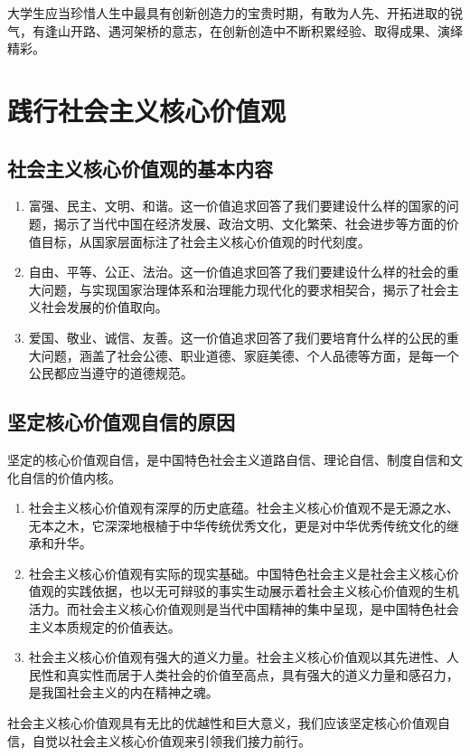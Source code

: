 大学生应当珍惜人生中最具有创新创造力的宝贵时期，有敢为人先、开拓进取的锐气，有逢山开路、遇河架桥的意志，在创新创造中不断积累经验、取得成果、演绎精彩。

\section{践行社会主义核心价值观}
\subsection{社会主义核心价值观的基本内容}
\begin{enumerate}
\item 富强、民主、文明、和谐。这一价值追求回答了我们要建设什么样的国家的问题，揭示了当代中国在经济发展、政治文明、文化繁荣、社会进步等方面的价值目标，从国家层面标注了社会主义核心价值观的时代刻度。
\item 自由、平等、公正、法治。这一价值追求回答了我们要建设什么样的社会的重大问题，与实现国家治理体系和治理能力现代化的要求相契合，揭示了社会主义社会发展的价值取向。
\item 爱国、敬业、诚信、友善。这一价值追求回答了我们要培育什么样的公民的重大问题，涵盖了社会公德、职业道德、家庭美德、个人品德等方面，是每一个公民都应当遵守的道德规范。
\end{enumerate}

\subsection{坚定核心价值观自信的原因}
坚定的核心价值观自信，是中国特色社会主义道路自信、理论自信、制度自信和文化自信的价值内核。
\begin{enumerate}
\item 社会主义核心价值观有深厚的历史底蕴。社会主义核心价值观不是无源之水、无本之木，它深深地根植于中华传统优秀文化，更是对中华优秀传统文化的继承和升华。
\item 社会主义核心价值观有实际的现实基础。中国特色社会主义是社会主义核心价值观的实践依据，也以无可辩驳的事实生动展示着社会主义核心价值观的生机活力。而社会主义核心价值观则是当代中国精神的集中呈现，是中国特色社会主义本质规定的价值表达。
\item 社会主义核心价值观有强大的道义力量。社会主义核心价值观以其先进性、人民性和真实性而居于人类社会的价值至高点，具有强大的道义力量和感召力，是我国社会主义的内在精神之魂。
\end{enumerate}

社会主义核心价值观具有无比的优越性和巨大意义，我们应该坚定核心价值观自信，自觉以社会主义核心价值观来引领我们接力前行。

